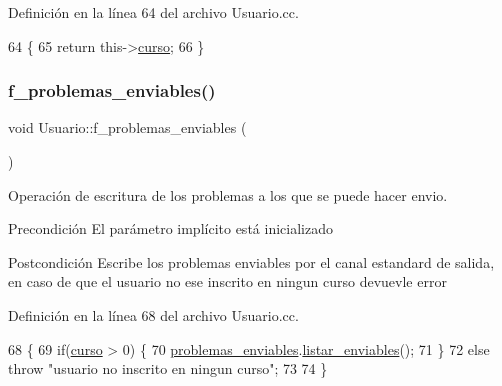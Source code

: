 Definición en la línea 64 del archivo Usuario.\+cc.


\begin{DoxyCode}
64                          \{
65   \textcolor{keywordflow}{return} this->\mbox{\hyperlink{class_usuario_aa767fe2d1198f2c97791073bc55803e7}{curso}};
66 \}
\end{DoxyCode}
\mbox{\label{class_usuario_a11ee6d52132455ed32f3df6824c7b9c5}} 
\subsubsection{\texorpdfstring{f\+\_\+problemas\+\_\+enviables()}{f\_problemas\_enviables()}}
{\footnotesize\ttfamily void Usuario\+::f\+\_\+problemas\+\_\+enviables (\begin{DoxyParamCaption}{ }\end{DoxyParamCaption})}



Operación de escritura de los problemas a los que se puede hacer envio. 

\begin{DoxyPrecond}{Precondición}
El parámetro implícito está inicializado 
\end{DoxyPrecond}
\begin{DoxyPostcond}{Postcondición}
Escribe los problemas enviables por el canal estandard de salida, en caso de que el usuario no ese inscrito en ningun curso devuevle error 
\end{DoxyPostcond}


Definición en la línea 68 del archivo Usuario.\+cc.


\begin{DoxyCode}
68                                     \{
69   \textcolor{keywordflow}{if}(\mbox{\hyperlink{class_usuario_aa767fe2d1198f2c97791073bc55803e7}{curso}} > 0) \{
70     \mbox{\hyperlink{class_usuario_a553cef1aad192b30d010cd524f261c1b}{problemas\_enviables}}.\mbox{\hyperlink{class_cjt__problema_a9f5508bb9d73918c4c99c6218315f168}{listar\_enviables}}();
71   \}
72   \textcolor{keywordflow}{else} \textcolor{keywordflow}{throw} \textcolor{stringliteral}{"usuario no inscrito en ningun curso"};
73 
74 \}
\end{DoxyCode}
\mbox{\label{class_usuario_a6f504aa9a6cb6467e02a01b40951b31c}} 
